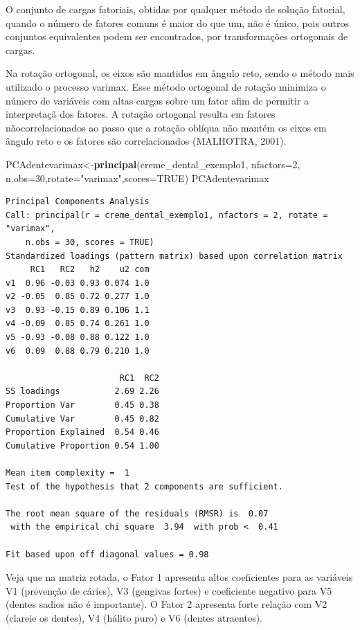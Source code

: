 \documentclass[12pt,brazil,oneside]{book}
\newenvironment{Shaded}{\begin{snugshade}}{\end{snugshade}}
\newcommand{\DataTypeTok}[1]{\textcolor[rgb]{0.13,0.29,0.53}{#1}}
\newcommand{\DecValTok}[1]{\textcolor[rgb]{0.00,0.00,0.81}{#1}}
\newcommand{\KeywordTok}[1]{\textcolor[rgb]{0.13,0.29,0.53}{\textbf{#1}}}
\newcommand{\NormalTok}[1]{#1}
\newcommand{\OtherTok}[1]{\textcolor[rgb]{0.56,0.35,0.01}{#1}}
\newcommand{\StringTok}[1]{\textcolor[rgb]{0.31,0.60,0.02}{#1}}
\begin{document}
O conjunto de cargas fatoriais, obtidas por qualquer método de solução
fatorial, quando o número de fatores comuns é maior do que um, não é
único, pois outros conjuntos equivalentes podem ser encontrados, por
transformações ortogonais de cargas.

Na rotação ortogonal, os eixos são mantidos em ângulo reto, sendo o
método mais utilizado o processo varimax. Esse método ortogonal de
rotação minimiza o número de variáveis com altas cargas sobre um fator
afim de permitir a interpretaçã dos fatores. A rotação ortogonal resulta
em fatores nãocorrelacionados ao passo que a rotação oblíqua não mantém
os eixos em ângulo reto e os fatores são correlacionados (MALHOTRA,
2001).

\begin{Shaded}
\begin{Highlighting}[]
\NormalTok{PCAdentevarimax<-}\KeywordTok{principal}\NormalTok{(creme_dental_exemplo1, }\DataTypeTok{nfactors=}\DecValTok{2}\NormalTok{,}
            \DataTypeTok{n.obs=}\DecValTok{30}\NormalTok{,}\DataTypeTok{rotate=}\StringTok{"varimax"}\NormalTok{,}\DataTypeTok{scores=}\OtherTok{TRUE}\NormalTok{)}
\NormalTok{PCAdentevarimax}
\end{Highlighting}
\end{Shaded}

\begin{verbatim}
Principal Components Analysis
Call: principal(r = creme_dental_exemplo1, nfactors = 2, rotate = "varimax", 
    n.obs = 30, scores = TRUE)
Standardized loadings (pattern matrix) based upon correlation matrix
     RC1   RC2   h2    u2 com
v1  0.96 -0.03 0.93 0.074 1.0
v2 -0.05  0.85 0.72 0.277 1.0
v3  0.93 -0.15 0.89 0.106 1.1
v4 -0.09  0.85 0.74 0.261 1.0
v5 -0.93 -0.08 0.88 0.122 1.0
v6  0.09  0.88 0.79 0.210 1.0

                       RC1  RC2
SS loadings           2.69 2.26
Proportion Var        0.45 0.38
Cumulative Var        0.45 0.82
Proportion Explained  0.54 0.46
Cumulative Proportion 0.54 1.00

Mean item complexity =  1
Test of the hypothesis that 2 components are sufficient.

The root mean square of the residuals (RMSR) is  0.07 
 with the empirical chi square  3.94  with prob <  0.41 

Fit based upon off diagonal values = 0.98
\end{verbatim}

Veja que na matriz rotada, o Fator 1 apresenta altos coeficientes para
as variáveis V1 (prevenção de cáries), V3 (gengivas fortes) e
coeficiente negativo para V5 (dentes sadios não é importante). O Fator 2
apresenta forte relação com V2 (clareie os dentes), V4 (hálito puro) e
V6 (dentes atraentes).
\end{document}
